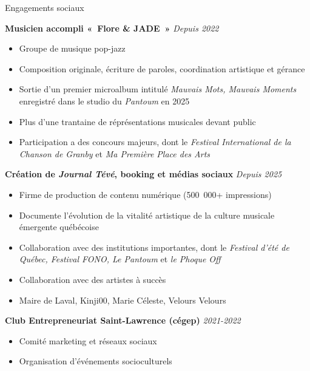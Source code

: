 \documentclass{resume} %
\begin{document}
\begin{rSection}{Engagements sociaux}

{\bf Musicien accompli «~Flore \& JADE~»} \hfill {\em Depuis 2022}
\begin{itemize}
	\vspace{-0.1cm}\item Groupe de musique pop-jazz
	\vspace{-0.3cm}\item Composition originale, écriture de paroles, coordination artistique et gérance
	\vspace{-0.3cm}\item Sortie d'un premier microalbum intitulé {\em Mauvais Mots, Mauvais Moments} enregistré dans le studio du {\em Pantoum} en 2025
	\vspace{-0.3cm}\item Plus d'une trantaine de réprésentations musicales devant public
    \vspace{-0.3cm}\item Participation a des concours majeurs, dont le {\em Festival International de la Chanson de Granby} et {\em Ma Première Place des Arts}
\end{itemize}

{\bf Création de {\em Journal Tévé}, booking et médias sociaux} \hfill {\em Depuis 2025}
\begin{itemize}
	\vspace{-0.1cm}\item Firme de production de contenu numérique (500~000+ impressions)
	\vspace{-0.3cm}\item Documente l'évolution de la vitalité artistique de la culture musicale émergente québécoise
	\vspace{-0.3cm}\item Collaboration avec des institutions importantes, dont le {\em Festival d'été de Québec, Festival FONO, Le Pantoum} et {\em le Phoque Off}
	\vspace{-0.3cm}\item Collaboration avec des artistes à succès
	\vspace{-0.1cm}\item Maire de Laval, Kinji00, Marie Céleste, Velours Velours
\end{itemize}

{\bf Club Entrepreneuriat Saint-Lawrence (cégep)} \hfill {\em 2021-2022}
\begin{itemize}
	\vspace{-0.1cm}\item Comité marketing et réseaux sociaux
	\vspace{-0.3cm}\item Organisation d'événements socioculturels
\end{itemize}

\end{rSection}
\end{document}

